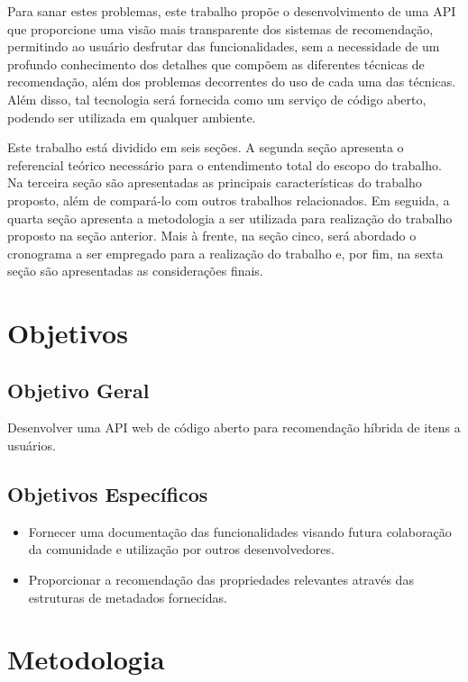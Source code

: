 \documentclass[12pt, openright, oneside, a4paper, brazil]{abntex2}
\begin{document}
Para sanar estes problemas, este trabalho propõe o desenvolvimento de uma API que proporcione uma visão mais transparente dos sistemas de recomendação, permitindo ao usuário desfrutar das funcionalidades, sem a necessidade de um profundo conhecimento dos detalhes que compõem as diferentes técnicas de recomendação, além dos problemas decorrentes do uso de cada uma das técnicas. Além disso, tal tecnologia será fornecida como um serviço de código aberto, podendo ser utilizada em qualquer ambiente.

Este trabalho está dividido em seis seções. A segunda seção apresenta o referencial teórico necessário para o entendimento total do escopo do trabalho. Na terceira seção são apresentadas as principais características do trabalho proposto, além de compará-lo com outros trabalhos relacionados. Em seguida, a quarta seção apresenta a metodologia a ser utilizada para realização do trabalho proposto na seção anterior. Mais à frente, na seção cinco, será abordado o cronograma a ser empregado para a realização do trabalho e, por fim, na sexta seção são apresentadas as considerações finais.

\section{Objetivos}

\subsection{Objetivo Geral}

Desenvolver uma API web de código aberto para recomendação híbrida de itens a usuários.

\subsection{Objetivos Específicos}

\begin{itemize}

	\item Fornecer uma documentação das funcionalidades visando futura colaboração da comunidade e utilização por outros desenvolvedores.
	\item Proporcionar a recomendação das propriedades relevantes através das estruturas de metadados fornecidas.

\end{itemize}

\section{Metodologia}
\end{document}
